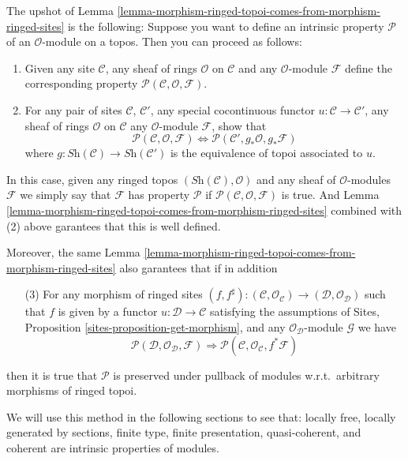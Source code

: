 \medskip\noindent
The upshot of
Lemma \ref{lemma-morphism-ringed-topoi-comes-from-morphism-ringed-sites}
is the following: Suppose you want to define
an intrinsic property $\mathcal{P}$ of an $\mathcal{O}$-module on a
topos. Then you can proceed as follows:
\begin{enumerate}
\item Given any site $\mathcal{C}$, any sheaf of rings $\mathcal{O}$
on $\mathcal{C}$ and any $\mathcal{O}$-module $\mathcal{F}$
define the corresponding
property $\mathcal{P}(\mathcal{C}, \mathcal{O}, \mathcal{F})$.
\item For any pair of sites $\mathcal{C}$, $\mathcal{C}'$, any
special cocontinuous functor $u : \mathcal{C} \to \mathcal{C}'$,
any sheaf of rings $\mathcal{O}$ on $\mathcal{C}$ any
$\mathcal{O}$-module $\mathcal{F}$, show that
$$
\mathcal{P}(\mathcal{C}, \mathcal{O}, \mathcal{F})
\Leftrightarrow
\mathcal{P}(\mathcal{C}', g_*\mathcal{O}, g_*\mathcal{F})
$$
where $g : \textit{Sh}(\mathcal{C}) \to \textit{Sh}(\mathcal{C}')$
is the equivalence of topoi associated to $u$.
\end{enumerate}
In this case, given any ringed topos $(\textit{Sh}(\mathcal{C}), \mathcal{O})$
and any sheaf of $\mathcal{O}$-modules $\mathcal{F}$ we simply say that
$\mathcal{F}$ has property $\mathcal{P}$ if
$\mathcal{P}(\mathcal{C}, \mathcal{O}, \mathcal{F})$ is true.
And Lemma \ref{lemma-morphism-ringed-topoi-comes-from-morphism-ringed-sites}
combined with (2) above garantees that this is well defined.

\medskip\noindent
Moreover, the same
Lemma \ref{lemma-morphism-ringed-topoi-comes-from-morphism-ringed-sites}
also garantees that if in addition
\begin{enumerate}
\item[(3)] For any morphism of ringed sites
$(f, f^\sharp) :
(\mathcal{C}, \mathcal{O}_{\mathcal{C}})
\to
(\mathcal{D}, \mathcal{O}_{\mathcal{D}})$
such that $f$ is given by a functor
$u : \mathcal{D} \to \mathcal{C}$ satisfying the
assumptions of Sites, Proposition \ref{sites-proposition-get-morphism}, 
and any $\mathcal{O}_{\mathcal{D}}$-module $\mathcal{G}$
we have
$$
\mathcal{P}(\mathcal{D}, \mathcal{O}_{\mathcal{D}}, \mathcal{F})
\Rightarrow
\mathcal{P}(\mathcal{C}, \mathcal{O}_{\mathcal{C}}, f^*\mathcal{F})
$$
\end{enumerate}
then it is true that $\mathcal{P}$ is preserved under pullback
of modules w.r.t.\ arbitrary morphisms of ringed topoi.

\medskip\noindent
We will use this method in the following sections to see
that:
locally free,
locally generated by sections,
finite type,
finite presentation,
quasi-coherent, and
coherent
are intrinsic properties of modules.

